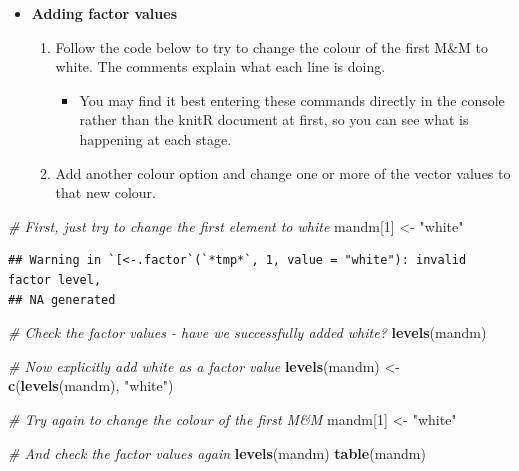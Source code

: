 \documentclass[a4paper]{book}
\newenvironment{Shaded}{\begin{snugshade}}{\end{snugshade}}
\newcommand{\KeywordTok}[1]{\textcolor[rgb]{0.13,0.29,0.53}{\textbf{{#1}}}}
\newcommand{\DecValTok}[1]{\textcolor[rgb]{0.00,0.00,0.81}{{#1}}}
\newcommand{\StringTok}[1]{\textcolor[rgb]{0.31,0.60,0.02}{{#1}}}
\newcommand{\CommentTok}[1]{\textcolor[rgb]{0.56,0.35,0.01}{\textit{{#1}}}}
\newcommand{\NormalTok}[1]{{#1}}
\providecommand{\tightlist}{%
  \setlength{\itemsep}{0pt}\setlength{\parskip}{0pt}}
\renewenvironment{Shaded}
{\vspace{1.5em}\begin{leftbar}\begin{snugshade}}
{\end{snugshade}\end{leftbar}\vspace{3pt}}
\newenvironment{rmdblock}[1]
  {\vspace{1.5em}\begin{shaded*}
  \begin{itemize}
  \renewcommand{\labelitemi}{
    \raisebox{-.7\height}[0pt][0pt]{
      {\setkeys{Gin}{width=3em,keepaspectratio}\texttt{[image: images/\#1]}}
    }
  }
  \item
  }
  {
  \end{itemize}
  \end{shaded*}
  }
\newenvironment{rmdexercise}
  {\begin{rmdblock}{exercise}}
  {\end{rmdblock}}
\begin{document}
\begin{rmdexercise}
\textbf{Adding factor values}

\begin{enumerate}
\def\labelenumi{\arabic{enumi}.}
\item
  Follow the code below to try to change the colour of the first M\&M to
  white. The comments explain what each line is doing.

  \begin{itemize}
  \tightlist
  \item
    You may find it best entering these commands directly in the console
    rather than the knitR document at first, so you can see what is
    happening at each stage.
  \end{itemize}
\item
  Add another colour option and change one or more of the vector values
  to that new colour.
\end{enumerate}
\end{rmdexercise}

\begin{Shaded}
\begin{Highlighting}[]
\CommentTok{# First, just try to change the first element to white}
\NormalTok{mandm[}\DecValTok{1}\NormalTok{] <-}\StringTok{ "white"}
\end{Highlighting}
\end{Shaded}

\begin{verbatim}
## Warning in `[<-.factor`(`*tmp*`, 1, value = "white"): invalid factor level,
## NA generated
\end{verbatim}

\begin{Shaded}
\begin{Highlighting}[]
\CommentTok{# Check the factor values - have we successfully added white?}
\KeywordTok{levels}\NormalTok{(mandm)}

\CommentTok{# Now explicitly add white as a factor value}
\KeywordTok{levels}\NormalTok{(mandm) <-}\StringTok{ }\KeywordTok{c}\NormalTok{(}\KeywordTok{levels}\NormalTok{(mandm), }\StringTok{"white"}\NormalTok{)}

\CommentTok{# Try again to change the colour of the first M&M}
\NormalTok{mandm[}\DecValTok{1}\NormalTok{] <-}\StringTok{ "white"}

\CommentTok{# And check the factor values again}
\KeywordTok{levels}\NormalTok{(mandm)}
\KeywordTok{table}\NormalTok{(mandm)}
\end{Highlighting}
\end{Shaded}
\end{document}
